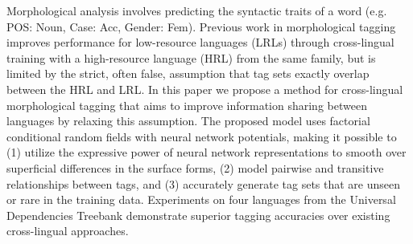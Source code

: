 Morphological analysis involves predicting the syntactic traits of a word (e.g. {POS: Noun, Case: Acc, Gender: Fem}). Previous work in morphological tagging improves performance for low-resource languages (LRLs) through cross-lingual training with a high-resource language (HRL) from the same family, but is limited by the strict, often false, assumption that tag sets exactly overlap between the HRL and LRL. In this paper we propose a method for cross-lingual morphological tagging that aims to improve information sharing between languages by relaxing this assumption. The proposed model uses factorial conditional random fields with neural network potentials, making it possible to (1) utilize the expressive power of neural network representations to smooth over superficial differences in the surface forms, (2) model pairwise and transitive relationships between tags, and (3) accurately generate tag sets that are unseen or rare in the training data. Experiments on four languages from the Universal Dependencies Treebank demonstrate superior tagging accuracies over existing cross-lingual approaches.
